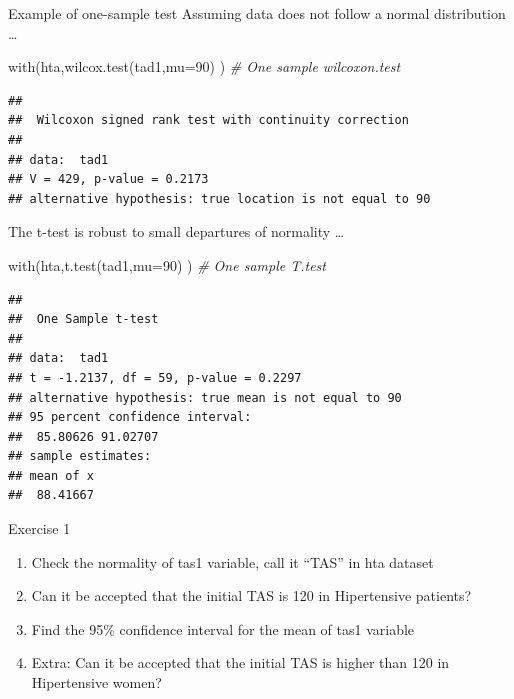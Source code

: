\documentclass[
  ignorenonframetext,
]{beamer}
\newenvironment{Shaded}{\begin{snugshade}}{\end{snugshade}}
\newcommand{\AttributeTok}[1]{\textcolor[rgb]{0.77,0.63,0.00}{#1}}
\newcommand{\CommentTok}[1]{\textcolor[rgb]{0.56,0.35,0.01}{\textit{#1}}}
\newcommand{\DecValTok}[1]{\textcolor[rgb]{0.00,0.00,0.81}{#1}}
\newcommand{\FunctionTok}[1]{\textcolor[rgb]{0.00,0.00,0.00}{#1}}
\newcommand{\NormalTok}[1]{#1}
\providecommand{\tightlist}{%
  \setlength{\itemsep}{0pt}\setlength{\parskip}{0pt}}
\begin{document}
\begin{frame}[fragile]{Example of one-sample test}
\protect\hypertarget{example-of-one-sample-test}{}
Assuming data does not follow a normal distribution \ldots{}

\tiny

\begin{Shaded}
\begin{Highlighting}[]
\FunctionTok{with}\NormalTok{(hta,}\FunctionTok{wilcox.test}\NormalTok{(tad1,}\AttributeTok{mu=}\DecValTok{90}\NormalTok{) ) }\CommentTok{\# One sample wilcoxon.test}
\end{Highlighting}
\end{Shaded}

\begin{verbatim}
## 
##  Wilcoxon signed rank test with continuity correction
## 
## data:  tad1
## V = 429, p-value = 0.2173
## alternative hypothesis: true location is not equal to 90
\end{verbatim}

The t-test is robust to small departures of normality \ldots{}

\tiny

\begin{Shaded}
\begin{Highlighting}[]
\FunctionTok{with}\NormalTok{(hta,}\FunctionTok{t.test}\NormalTok{(tad1,}\AttributeTok{mu=}\DecValTok{90}\NormalTok{) ) }\CommentTok{\# One sample T.test}
\end{Highlighting}
\end{Shaded}

\begin{verbatim}
## 
##  One Sample t-test
## 
## data:  tad1
## t = -1.2137, df = 59, p-value = 0.2297
## alternative hypothesis: true mean is not equal to 90
## 95 percent confidence interval:
##  85.80626 91.02707
## sample estimates:
## mean of x 
##  88.41667
\end{verbatim}
\end{frame}

\begin{frame}{Exercise 1}
\protect\hypertarget{exercise-1}{}
\begin{enumerate}
\tightlist
\item
  Check the normality of tas1 variable, call it ``TAS'' in hta dataset
\item
  Can it be accepted that the initial TAS is 120 in Hipertensive
  patients?
\item
  Find the 95\% confidence interval for the mean of tas1 variable
\item
  Extra: Can it be accepted that the initial TAS is higher than 120 in
  Hipertensive women?
\end{enumerate}
\end{frame}
\end{document}
